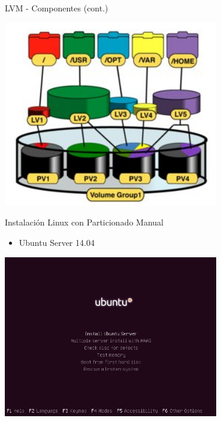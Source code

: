 \begin{frame}{LVM - Componentes (cont.)}
 \begin{center}
  \includegraphics[width=0.7\textwidth]{images/lvm1.png}
 \end{center}
\end{frame}

\begin{frame}{Instalación Linux con Particionado Manual}
 \begin{itemize}
  \item Ubuntu Server 14.04
 \end{itemize} 
 \begin{center}
  \includegraphics[width=0.7\textwidth]{images/install1.png}
 \end{center}
\end{frame}

